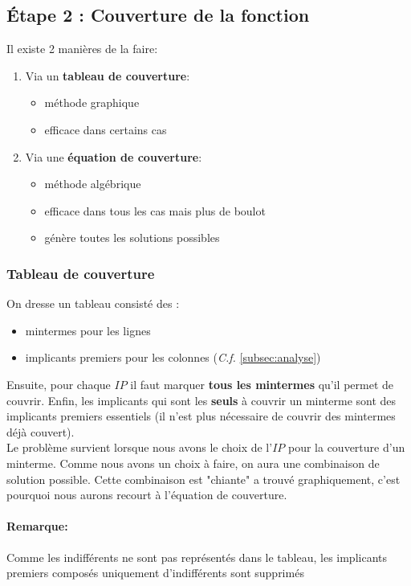\subsection{Étape 2 : Couverture de la fonction}
Il existe 2 manières de la faire:
\begin{enumerate}
	\item Via un \textbf{tableau de couverture}:
	\begin{itemize}
		\item méthode graphique
		\item efficace dans certains cas
	\end{itemize}
	\item Via une \textbf{équation de couverture}:
	\begin{itemize}
		\item méthode algébrique
		\item efficace dans tous les cas mais plus de boulot
		\item génère toutes les solutions possibles
	\end{itemize}
\end{enumerate}
\subsubsection{Tableau de couverture}
On dresse un tableau consisté des :
\begin{itemize}
	\item mintermes pour les lignes
	\item implicants premiers pour les colonnes (\textit{C.f.} \autoref{subsec:analyse})
\end{itemize}
Ensuite, pour chaque $IP$ il faut marquer \textbf{tous les mintermes} qu'il permet de couvrir. Enfin, les implicants qui sont les \textbf{seuls} à couvrir un minterme sont des implicants premiers essentiels (il n'est plus nécessaire de couvrir des mintermes déjà couvert).\\

Le problème survient lorsque nous avons le choix de l'$IP$ pour la couverture d'un minterme. Comme nous avons un choix à faire, on aura une combinaison de solution possible. Cette combinaison est "chiante" a trouvé graphiquement, c'est pourquoi nous aurons recourt à l'équation de couverture.

\paragraph{Remarque:} Comme les indifférents ne sont pas représentés dans le tableau, les implicants premiers composés uniquement d'indifférents sont supprimés
